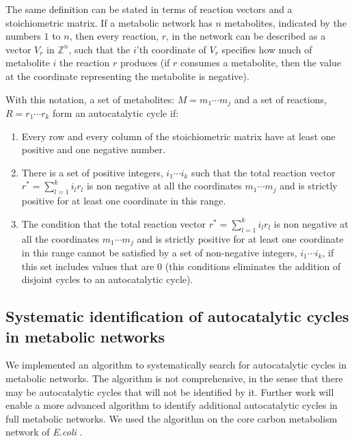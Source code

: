 The same definition can be stated in terms of reaction vectors and a stoichiometric matrix.
If a metabolic network has $n$ metabolites, indicated by the numbers $1$ to $n$, then every reaction, $r$, in the network can be described as a vector $V_r$ in $\mathbb{Z}^n$, such that the $i$'th coordinate of $V_r$ specifies how much of metabolite $i$ the reaction $r$ produces (if $r$ consumes a metabolite, then the value at the coordinate representing the metabolite is negative).

With this notation, a set of metabolites: $M={m_1\cdots m_j}$ and a set of reactions, $R={r_1\cdots r_k}$ form an autocatalytic cycle if:
\begin{enumerate}
    \item Every row and every column of the stoichiometric matrix have at least one positive and one negative number.
    \item There is a set of positive integers, $i_1\cdots i_k$ such that the total reaction vector $r^*=\sum_{l=1}^k i_lr_l$ is non negative at all the coordinates $m_1\cdots m_j$ and is strictly positive for at least one coordinate in this range.
    \item The condition that the total reaction vector $r^*=\sum_{l=1}^k i_lr_l$ is non negative at all the coordinates $m_1\cdots m_j$ and is strictly positive for at least one coordinate in this range cannot be satisfied by a set of non-negative integers, $i_1\cdots i_k$, if this set includes values that are $0$ (this conditions eliminates the addition of disjoint cycles to an autocatalytic cycle).
\end{enumerate}

  \subsection{Systematic identification of autocatalytic cycles in metabolic networks}
  We implemented an algorithm to systematically search for autocatalytic cycles in metabolic networks.
  The algorithm is not comprehensive, in the sense that there may be autocatalytic cycles that will not be identified by it.
  Further work will enable a more advanced algorithm to identify additional autocatalytic cycles in full metabolic networks.
  We used the algorithm on the core carbon metabolism network of \emph{E.coli} \cite{Orth2010-vl}.

